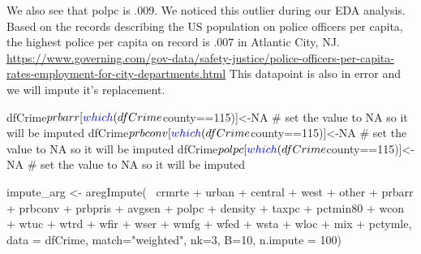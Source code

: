 \documentclass[]{article}
\newenvironment{Shaded}{}{}
\newcommand{\CommentTok}[1]{\textcolor[rgb]{0.00,0.50,0.00}{#1}}
\newcommand{\DataTypeTok}[1]{#1}
\newcommand{\DecValTok}[1]{#1}
\newcommand{\KeywordTok}[1]{\textcolor[rgb]{0.00,0.00,1.00}{#1}}
\newcommand{\NormalTok}[1]{#1}
\newcommand{\OperatorTok}[1]{#1}
\newcommand{\OtherTok}[1]{\textcolor[rgb]{1.00,0.25,0.00}{#1}}
\newcommand{\StringTok}[1]{\textcolor[rgb]{0.00,0.50,0.50}{#1}}
\begin{document}
We also see that polpc is .009. We noticed this outlier during our EDA
analysis. Based on the records describing the US population on police
officers per capita, the highest police per capita on record is .007 in
Atlantic City, NJ.
\url{https://www.governing.com/gov-data/safety-justice/police-officers-per-capita-rates-employment-for-city-departments.html}
This datapoint is also in error and we will impute it's replacement.

\begin{Shaded}
\begin{Highlighting}[]
\NormalTok{dfCrime}\OperatorTok{$}\NormalTok{prbarr[}\KeywordTok{which}\NormalTok{(dfCrime}\OperatorTok{$}\NormalTok{county}\OperatorTok{==}\DecValTok{115}\NormalTok{)]<-}\OtherTok{NA} \CommentTok{# set the value to NA so it will be imputed}
\NormalTok{dfCrime}\OperatorTok{$}\NormalTok{prbconv[}\KeywordTok{which}\NormalTok{(dfCrime}\OperatorTok{$}\NormalTok{county}\OperatorTok{==}\DecValTok{115}\NormalTok{)]<-}\OtherTok{NA} \CommentTok{# set the value to NA so it will be imputed}
\NormalTok{dfCrime}\OperatorTok{$}\NormalTok{polpc[}\KeywordTok{which}\NormalTok{(dfCrime}\OperatorTok{$}\NormalTok{county}\OperatorTok{==}\DecValTok{115}\NormalTok{)]<-}\OtherTok{NA} \CommentTok{# set the value to NA so it will be imputed}
\end{Highlighting}
\end{Shaded}

\begin{Shaded}
\begin{Highlighting}[]
\NormalTok{impute_arg <-}\StringTok{ }\KeywordTok{aregImpute}\NormalTok{(}\OperatorTok{~}\StringTok{ }\NormalTok{crmrte }\OperatorTok{+}\StringTok{  }\NormalTok{urban }\OperatorTok{+}\StringTok{ }\NormalTok{central }\OperatorTok{+}\StringTok{ }\NormalTok{west }\OperatorTok{+}\StringTok{ }\NormalTok{other }\OperatorTok{+}
\StringTok{                         }\NormalTok{prbarr }\OperatorTok{+}\StringTok{ }\NormalTok{prbconv }\OperatorTok{+}\StringTok{ }\NormalTok{prbpris }\OperatorTok{+}\StringTok{ }\NormalTok{avgsen }\OperatorTok{+}\StringTok{ }\NormalTok{polpc }\OperatorTok{+}\StringTok{ }
\StringTok{                         }\NormalTok{density }\OperatorTok{+}\StringTok{ }\NormalTok{taxpc }\OperatorTok{+}\StringTok{ }\NormalTok{pctmin80 }\OperatorTok{+}\StringTok{ }\NormalTok{wcon }\OperatorTok{+}\StringTok{ }\NormalTok{wtuc }\OperatorTok{+}
\StringTok{                         }\NormalTok{wtrd }\OperatorTok{+}\StringTok{ }\NormalTok{wfir }\OperatorTok{+}\StringTok{ }\NormalTok{wser }\OperatorTok{+}\StringTok{ }\NormalTok{wmfg }\OperatorTok{+}\StringTok{ }\NormalTok{wfed }\OperatorTok{+}\StringTok{ }\NormalTok{wsta }\OperatorTok{+}\StringTok{ }\NormalTok{wloc }\OperatorTok{+}
\StringTok{                         }\NormalTok{mix }\OperatorTok{+}\StringTok{ }\NormalTok{pctymle, }\DataTypeTok{data =}\NormalTok{ dfCrime, }\DataTypeTok{match=}\StringTok{"weighted"}\NormalTok{,}
                         \DataTypeTok{nk=}\DecValTok{3}\NormalTok{, }\DataTypeTok{B=}\DecValTok{10}\NormalTok{, }\DataTypeTok{n.impute =} \DecValTok{100}\NormalTok{)}
\end{Highlighting}
\end{Shaded}
\end{document}
